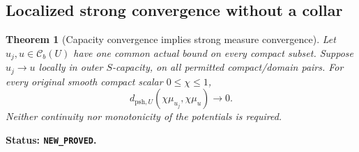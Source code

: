 \documentclass[11pt,a4paper]{article}
\numberwithin{equation}{section}
\newtheorem{theorem}{Theorem}[section]
\theoremstyle{definition}
\theoremstyle{remark}
\begin{document}
\subsection{Localized strong convergence without a collar}

\begin{theorem}[Capacity convergence implies strong measure convergence]
\label{thm:r3-relative-capacity-strong-dual}
Let $u_j,u\in\mathcal C_b(U)$ have one common actual bound on every
compact subset. Suppose $u_j\to u$ locally in outer $S$-capacity,
on all permitted compact/domain pairs. For every original smooth
compact scalar $0\leq\chi\leq1$,
\[
 d_{\mathrm{psh},U}(\chi\mu_{u_j},\chi\mu_u)\longrightarrow0.
\]
Neither continuity nor monotonicity of the potentials is required.
\end{theorem}

\noindent\textbf{Status: \texttt{NEW\_PROVED}.}
\end{document}

